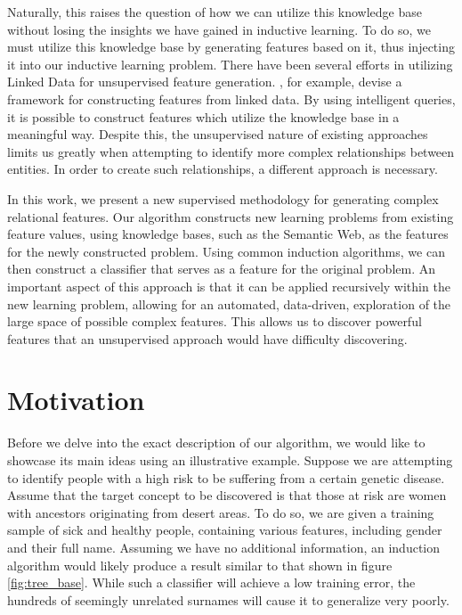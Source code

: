 \documentclass[twoside,11pt]{article}
\theoremstyle{definition}
\begin{document}

Naturally, this raises the question of how we can utilize this knowledge base without losing the insights we have gained in inductive learning. To do so, we must utilize this knowledge base by generating features based on it, thus injecting it into our inductive learning problem. There have been several efforts in utilizing Linked Data for unsupervised feature generation. , for example, devise a framework for constructing features from linked data. By using intelligent queries, it is possible to construct features which utilize the knowledge base in a meaningful way. Despite this, the unsupervised nature of existing approaches limits us greatly when attempting to identify more complex relationships between entities. In order to create such relationships, a different approach is necessary.

In this work, we present a new supervised methodology for generating complex relational features.  Our algorithm constructs new learning problems from existing feature values, using knowledge bases, such as the Semantic Web, as the features for the newly constructed problem.
Using common induction algorithms, we can then construct a classifier that serves as a feature for the original problem. An important aspect of this approach is that it can be applied recursively within the new learning problem, allowing for an automated, data-driven, exploration of the large space of possible complex features. This allows us to discover powerful features that an unsupervised approach would have difficulty discovering.

\section{Motivation} \label{motivation}

Before we delve into the exact description of our algorithm, we would like to showcase its main ideas using an illustrative example.
Suppose we are attempting to identify people with a high risk to be suffering from a certain genetic disease. Assume that the target concept to be discovered is that those at risk are women with ancestors originating from desert areas. To do so, we are given a training sample of sick and healthy people, containing various features, including gender and their full name.
Assuming we have no additional information, an induction algorithm would likely produce a result similar to that shown in figure \ref{fig:tree_base}. While such a classifier will achieve a low training error, the hundreds of seemingly unrelated surnames will cause it to generalize very poorly. 
\end{document}
